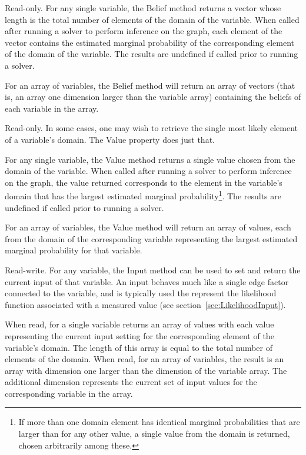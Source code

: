 \label{sec:Discrete.Belief}

Read-only.  For any single variable, the Belief method returns a vector whose length is the total number of elements of the domain of the variable.  When called after running a solver to perform inference on the graph, each element of the vector contains the estimated marginal probability of the corresponding element of the domain of the variable.  The results are undefined if called prior to running a solver.

For an array of variables, the Belief method will return an array of vectors (that is, an array one dimension larger than the variable array) containing the beliefs of each variable in the array.

\label{sec:Discrete.Value}

Read-only.  In some cases, one may wish to retrieve the single most likely element of a variable's domain.  The Value property does just that.

For any single variable, the Value method returns a single value chosen from the domain of the variable.  When called after running a solver to perform inference on the graph, the value returned corresponds to the element in the variable's domain that has the largest estimated marginal probability\footnote{If more than one domain element has identical marginal probabilities that are larger than for any other value, a single value from the domain is returned, chosen arbitrarily among these.}.  The results are undefined if called prior to running a solver.

For an array of variables, the Value method will return an array of values, each from the domain of the corresponding variable representing the largest estimated marginal probability for that variable.

\label{sec:Discrete.Input}

Read-write.  For any variable, the Input method can be used to set and return the current input of that variable. An input behaves much like a single edge factor connected to the variable, and is typically used the represent the likelihood function associated with a measured value (see section~\ref{sec:LikelihoodInput}).

When read, for a single variable returns an array of values with each value representing the current input setting for the corresponding element of the variable's domain.  The length of this array is equal to the total number of elements of the domain.  When read, for an array of variables, the result is an array with dimension one larger than the dimension of the variable array.  The additional dimension represents the current set of input values for the corresponding variable in the array.

